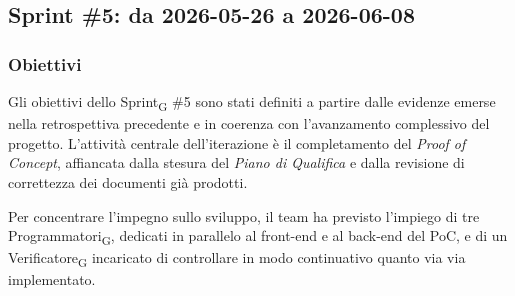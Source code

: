 \documentclass[a4paper, 10pt, colorlinks=true, linkcolor=black, urlcolor=blue, citecolor=blue, hidelinks]{article}
\begin{document}
\subsection{Sprint \#5: da 2026-05-26 a 2026-06-08}

\subsubsection{Obiettivi}
Gli obiettivi dello Sprint\textsubscript{G} \#5 sono stati definiti a partire dalle evidenze emerse nella retrospettiva precedente e in coerenza con l'avanzamento complessivo del progetto. L'attività centrale dell'iterazione è il completamento del \textit{Proof of Concept}, affiancata dalla stesura del \textit{Piano di Qualifica} e dalla revisione di correttezza dei documenti già prodotti.

Per concentrare l'impegno sullo sviluppo, il team ha previsto l'impiego di tre Programmatori\textsubscript{G}, dedicati in parallelo al front-end e al back-end del PoC, e di un Verificatore\textsubscript{G} incaricato di controllare in modo continuativo quanto via via implementato.
\end{document}
